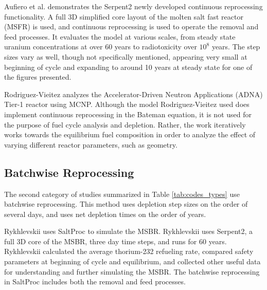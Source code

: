 Aufiero et al. \cite{aufiero_extended_2013} demonstrates the Serpent2 newly developed continuous reprocessing functionality. A full 3D simplified core layout of the molten salt fast reactor (MSFR) is used, and continuous reprocessing is used to operate the removal and feed processes. It evaluates the model at various scales, from steady state uranium concentrations at over 60 years to radiotoxicity over $10^8$ years. The step sizes vary as well, though not specifically mentioned, appearing very small at beginning of cycle and expanding to around 10 years at steady state for one of the figures presented.

Rodriguez-Vieitez \cite{rodriguez-vieitez_transmutation_2002} analyzes the Accelerator-Driven Neutron Applications (ADNA) Tier-1 reactor using MCNP. Although the model Rodriguez-Vieitez used does implement continuous reprocessing in the Bateman equation, it is not used for the purpose of fuel cycle analysis and depletion. Rather, the work iteratively works towards the equilibrium fuel composition in order to analyze the effect of varying different reactor parameters, such as geometry.


\subsection{Batchwise Reprocessing}
\label{litrev-msr-batchwise}

The second category of studies summarized in Table \ref{tab:codes_types} use batchwise reprocessing. This method uses depletion step sizes on the order of several days, and uses net depletion times on the order of years.

Rykhlevskii \cite{rykhlevskii_modeling_2019} uses SaltProc to simulate the MSBR. Rykhlevskii uses Serpent2, a full 3D core of the MSBR, three day time steps, and runs for 60 years.
Rykhlevskii calculated the average thorium-232 refueling rate, compared safety parameters at beginning of cycle and equilibrium, and collected other useful data for understanding and further simulating the MSBR.
The batchwise reprocessing in SaltProc includes both the removal and feed processes.

